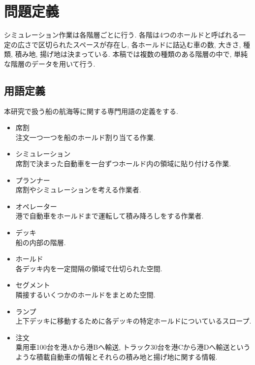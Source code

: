 \chapter{問題定義}\label{definition}

シミュレーション作業は各階層ごとに行う. 
各階は4つのホールドと呼ばれる一定の広さで区切られたスペースが存在し, 各ホールドに詰込む車の数, 大きさ, 種類, 積み地, 揚げ地は決まっている. 
本稿では複数の種類のある階層の中で, 単純な階層のデータを用いて行う. 



\section{用語定義}
本研究で扱う船の航海等に関する専門用語の定義をする.

\begin{itemize}
    \item 席割 \\
    注文一つ一つを船のホールド割り当てる作業.

    \item シミュレーション \\
    席割で決まった自動車を一台ずつホールド内の領域に貼り付ける作業.

    \item  プランナー \\
    席割やシミュレーションを考える作業者.

    \item  オペレーター\\
    港で自動車をホールドまで運転して積み降ろしをする作業者.

    \item デッキ \\
    船の内部の階層.

    \item ホールド \\
    各デッキ内を一定間隔の領域で仕切られた空間.

    \item セグメント \\
    隣接するいくつかのホールドをまとめた空間.

    \item ランプ \\
    上下デッキに移動するために各デッキの特定ホールドについているスロープ.

    \item 注文 \\
    乗用車100台を港Aから港Bへ輸送, トラック30台を港Cから港Dへ輸送というような積載自動車の情報とそれらの積み地と揚げ地に関する情報. 


\end{itemize}
